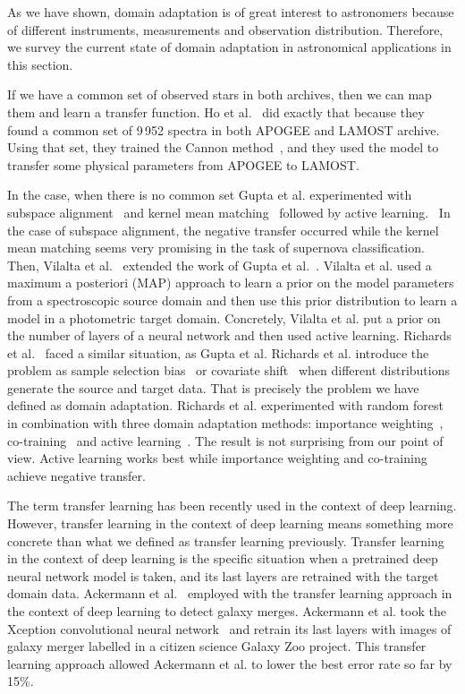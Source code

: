 
As we have shown, domain adaptation is of great interest to astronomers
because of different instruments, measurements and observation distribution.
Therefore, we survey the current state of domain adaptation in astronomical applications in this section.

If we have a common set of observed stars in both archives,
then we can map them and learn a transfer function.
Ho et al.~\cite{ho2017} did exactly that
because they found a common set of 9\,952 spectra in both APOGEE and LAMOST archive.
Using that set, they trained the Cannon method~\cite{ness2015},
and they used the model to transfer some physical parameters from APOGEE to LAMOST.

In the case, when there is no common set Gupta et al. experimented with subspace alignment~\cite{fernando2014} and kernel mean matching~\cite{gretton2009} followed by active learning.~\cite{gupta2016}
In the case of subspace alignment, the negative transfer occurred while the kernel mean matching seems very promising in the task of supernova classification.
Then, Vilalta et al.~\cite{vilalta2018} extended the work of Gupta et al.~\cite{gupta2016}.
Vilalta et al. used a maximum a posteriori (MAP) approach to learn a prior on the model parameters from a spectroscopic source domain
and then use this prior distribution to learn a model in a photometric target domain.
Concretely, Vilalta et al. put a prior on the number of layers of a neural network
and then used active learning.
Richards et al.~\cite{richards2011} faced a similar situation, as Gupta et al.
Richards et al. introduce the problem as sample selection bias~\cite{shimodaira2000} or covariate shift~\cite{heckman1979}
when different distributions generate the source and target data.
That is precisely the problem we have defined as domain adaptation.
Richards et al. experimented with random forest in combination with three domain adaptation methods:
importance weighting~\cite{shimodaira2000}, co-training~\cite{blum1998} and active learning~\cite{settles2009}.
The result is not surprising from our point of view.
Active learning works best while importance weighting and co-training achieve negative transfer.

The term transfer learning has been recently used in the context of deep learning.
However, transfer learning in the context of deep learning means something more concrete than what we defined as transfer learning previously.
Transfer learning in the context of deep learning is the specific situation
when a pretrained deep neural network model is taken,
and its last layers are retrained with the target domain data.
Ackermann et al.~\cite{ackermann2018} employed with the transfer learning approach in the context of deep learning to detect galaxy merges.
Ackermann et al. took the Xception convolutional neural network~\cite{chollet2017}
and retrain its last layers with images of galaxy merger labelled in a citizen science Galaxy Zoo project.
This transfer learning approach allowed Ackermann et al. to lower the best error rate so far by 15\%.

